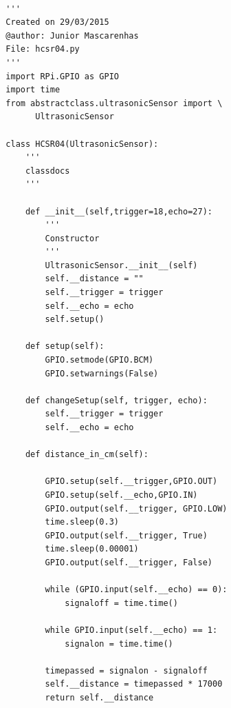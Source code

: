 \documentclass{acm_proc_article-sp}
\begin{document}
\renewcommand{\theFancyVerbLine}{
  \sffamily\textcolor[rgb]{0.5,0.5,0.5}{\scriptsize\arabic{FancyVerbLine}}}
\begin{verbatim}

  '''
  Created on 29/03/2015
  @author: Junior Mascarenhas
  File: hcsr04.py
  '''
  import RPi.GPIO as GPIO
  import time
  from abstractclass.ultrasonicSensor import \
  		UltrasonicSensor

  class HCSR04(UltrasonicSensor):
      '''
      classdocs
      '''

      def __init__(self,trigger=18,echo=27):
          '''
          Constructor
          '''
          UltrasonicSensor.__init__(self)
          self.__distance = ""
          self.__trigger = trigger
          self.__echo = echo
          self.setup()
        
      def setup(self):
          GPIO.setmode(GPIO.BCM)
          GPIO.setwarnings(False)

      def changeSetup(self, trigger, echo):
          self.__trigger = trigger
          self.__echo = echo

      def distance_in_cm(self):

          GPIO.setup(self.__trigger,GPIO.OUT)
          GPIO.setup(self.__echo,GPIO.IN)
          GPIO.output(self.__trigger, GPIO.LOW)
          time.sleep(0.3)
          GPIO.output(self.__trigger, True)
          time.sleep(0.00001)
          GPIO.output(self.__trigger, False)

          while (GPIO.input(self.__echo) == 0):
              signaloff = time.time()

          while GPIO.input(self.__echo) == 1:
              signalon = time.time()

          timepassed = signalon - signaloff
          self.__distance = timepassed * 17000
          return self.__distance

\end{verbatim}
\renewcommand{\theFancyVerbLine}{
  \sffamily\textcolor[rgb]{0.5,0.5,0.5}{\scriptsize\arabic{FancyVerbLine}}}
\end{document}
